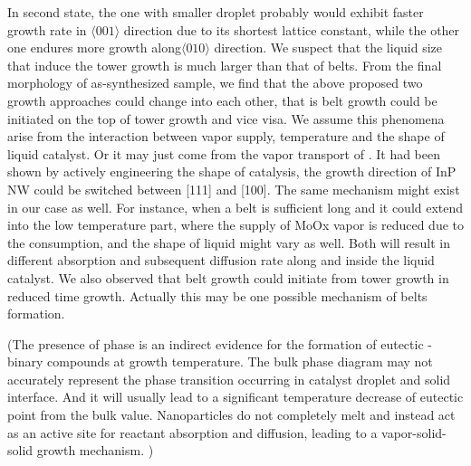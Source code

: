 In second state, the one with smaller droplet probably would exhibit faster growth rate in $\langle001\rangle$ direction due to its shortest lattice constant, while the other one endures more growth along$\langle010\rangle$ direction. We suspect that the liquid size that induce the tower growth is much larger than that of belts. From the final morphology of as-synthesized sample, we find that the above proposed two growth approaches could change into each other, that is belt growth could be initiated on the top of tower growth and vice visa. We assume this phenomena arise from the interaction between vapor supply, temperature and the shape of liquid catalyst. Or it may just come from the vapor transport of .
It had been shown by actively engineering the shape of catalysis, the growth direction of  InP NW could be switched between [111] and [100].\cite{Wang2013c} The same mechanism might exist in our case as well. For instance, when a belt is sufficient long and it could extend into the low temperature part, where the supply of MoOx vapor is reduced due to the consumption, and the shape of liquid might vary as well. Both will result in different absorption and subsequent diffusion rate along and inside the liquid catalyst. We also observed that belt growth could initiate from tower growth in reduced time growth. Actually this may be one possible mechanism of belts formation.

(The presence of  phase is an indirect evidence for the formation of eutectic -  binary compounds at growth temperature. The bulk phase diagram may not accurately represent the phase transition occurring in catalyst droplet and solid interface. And it will usually lead to a significant temperature decrease of eutectic point from the bulk value. Nanoparticles do not completely melt and instead act as an active site for reactant absorption and diffusion, leading to a vapor-solid-solid growth mechanism. )

